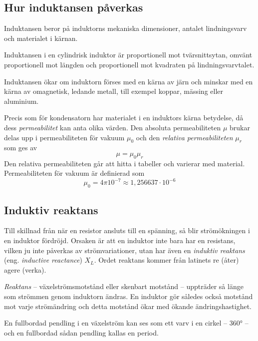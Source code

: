 \subsection{Hur induktansen påverkas}

Induktansen beror på induktorns mekaniska dimensioner, antalet lindningsvarv och
materialet i kärnan.

Induktansen i en cylindrisk induktor är proportionell mot tvärsnittsytan, omvänt
proportionell mot längden och proportionell mot kvadraten på lindningsvarvtalet.

Induktansen ökar om induktorn förses med en kärna av järn och minskar med en
kärna av omagnetisk, ledande metall, till exempel koppar, mässing eller
aluminium.

Precis som för kondensatorn har materialet i en induktors kärna betydelse,
då dess \emph{permeabilitet} kan anta olika värden. Den absoluta permeabiliteten
\(\mu\) brukar delas upp i permeabiliteten för vakuum \(\mu_0\) och den
\emph{relativa permeabiliteten} \(\mu_r\) som ges av
\[\mu = \mu_0\mu_r\]
Den relativa permeabiliteten går att hitta i tabeller och varierar med material.
Permeabiliteten för vakuum är definierad som
\[\mu_0 = 4\pi 10^{-7} \approx 1,256637 \cdot 10^{-6}\]

\subsection{Induktiv reaktans}
\label{induktiv_reaktans}

Till skillnad från när en resistor ansluts till en spänning, så blir
strömökningen i en induktor fördröjd. Orsaken är att en induktor inte bara har
en resistans, vilken ju inte påverkas av strömvariationer, utan har även en
\emph{induktiv reaktans} (eng. \emph{inductive reactance}) \(X_L\).
Ordet reaktans kommer från latinets re (åter) agere (verka).

\emph{Reaktans} -- växelströmsmotstånd eller skenbart motstånd -- uppträder så
länge som strömmen genom induktorn ändras.
En induktor gör således också motstånd mot varje strömändring och detta motstånd
ökar med ökande ändringshastighet.

En fullbordad pendling i en växelström kan ses som ett varv i en cirkel --
\ang{360} -- och en fullbordad sådan pendling kallas en period.


